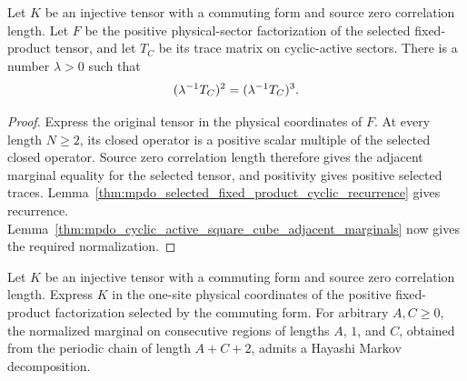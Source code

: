 \begin{lemma}
    \label{thm:mpdo_selected_fixed_product_square_cube}
    \leanok
    Let $K$ be an injective tensor with a commuting form and source zero
    correlation length. Let $F$ be the
    positive physical-sector factorization of the selected fixed-product
    tensor, and let $T_C$ be its trace matrix on cyclic-active sectors. There
    is a number $\lambda>0$ such that
    \begin{align}
        (\lambda^{-1}T_C)^2=(\lambda^{-1}T_C)^3.
        \notag
    \end{align}
\end{lemma}

\begin{proof}\leanok
    Express the original tensor in the physical coordinates of $F$. At every
    length $N\geq2$, its closed operator is a positive scalar multiple of the
    selected closed operator. Source zero correlation length therefore gives
    the adjacent marginal equality for the selected tensor, and positivity
    gives positive selected traces.
    Lemma~\ref{thm:mpdo_selected_fixed_product_cyclic_recurrence} gives
    recurrence.
    Lemma~\ref{thm:mpdo_cyclic_active_square_cube_adjacent_marginals} now
    gives the required normalization.
\end{proof}

\begin{lemma}
    \label{thm:mpdo_selected_fixed_product_markov_cuts}
    \leanok
    Let $K$ be an injective tensor with a commuting form and source zero
    correlation length. Express $K$ in the one-site physical coordinates of the
    positive fixed-product factorization selected by the commuting form.
    For arbitrary $A,C\geq0$, the normalized marginal on consecutive regions of
    lengths $A$, $1$, and $C$, obtained from the periodic chain of length
    $A+C+2$, admits a Hayashi Markov decomposition.
\end{lemma}

